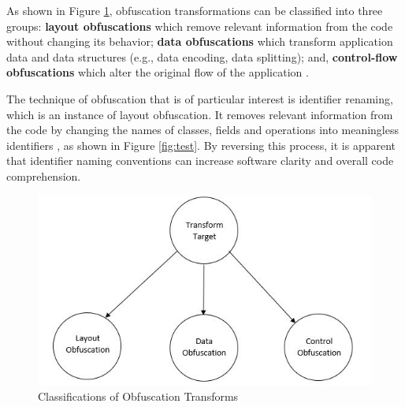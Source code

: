 As shown in Figure \ref{fig:Transforms}, obfuscation transformations can be classified into three groups: \textbf{layout obfuscations} which remove
relevant information from the code without changing its behavior; \textbf{data obfuscations} which transform application
data and data structures (e.g., data encoding, data splitting); and, \textbf{control-flow obfuscations} which alter the original flow of the application \cite{collberg_taxonomy_1997}.

The technique of obfuscation that is of particular interest is identifier renaming, which is an instance of layout obfuscation.
It removes relevant information from the code by changing the names of classes, fields and operations into
meaningless identifiers \cite{ceccato_effectiveness_2009}, as shown in Figure \ref{fig:test}. By reversing this process, it is apparent that identifier naming conventions can increase software clarity and overall code comprehension.

\begin{figure}[ht]
\centering
\includegraphics[scale=.7]{images/Obfuscate}
\caption{Classifications of Obfuscation Transforms}
\label{fig:Transforms}
\end{figure}

